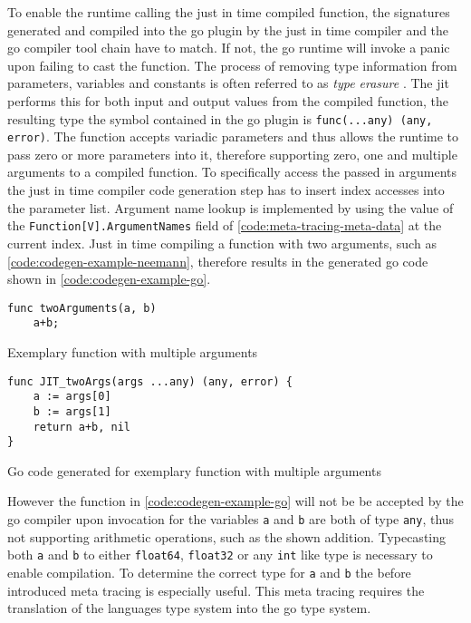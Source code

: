 To enable the runtime calling the just in time compiled function, the
signatures generated and compiled into the go plugin by the just in time
compiler and the go compiler tool chain have to match. If not, the go runtime
will invoke a panic upon failing to cast the function. The process of removing
type information from parameters, variables and constants is often referred to
as \textit{type erasure} \cite[A.2 Type erasure]{crary2002intensional}. The jit
performs this for both input and output values from the compiled function, the
resulting type the symbol contained in the go plugin is
\texttt{func(...any) (any, error)}. The function accepts variadic
parameters and thus allows the runtime to pass zero or more parameters into it,
therefore supporting zero, one and multiple arguments to a compiled function.
To specifically access the passed in arguments the just in time compiler code
generation step has to insert index accesses into the parameter list. Argument
name lookup is implemented by using the value of the
\texttt{Function[V].ArgumentNames} field of
\autoref{code:meta-tracing-meta-data} at the current index. Just in time
compiling a function with two arguments, such as
\autoref{code:codegen-example-neemann}, therefore results in the generated go
code shown in \autoref{code:codegen-example-go}.

\begin{listing}[H]
    \begin{verbatim}
func twoArguments(a, b)
    a+b;
    \end{verbatim}
    \caption{Exemplary function with multiple arguments}
    \label{code:codegen-example-neemann}
\end{listing}

\begin{listing}[H]
    \begin{verbatim}
func JIT_twoArgs(args ...any) (any, error) { 
    a := args[0]
    b := args[1]
    return a+b, nil
}
    \end{verbatim}
    \caption{Go code generated for exemplary function with multiple arguments}
    \label{code:codegen-example-go}
\end{listing}

However the function in \autoref{code:codegen-example-go} will not be be
accepted by the go compiler upon invocation for the variables \texttt{a} and
\texttt{b} are both of type \texttt{any}, thus not supporting
arithmetic operations, such as the shown addition. Typecasting both \texttt{a}
and \texttt{b} to either \texttt{float64}, \texttt{float32} or
any \texttt{int} like type is necessary to enable compilation. To
determine the correct type for \texttt{a} and \texttt{b} the before introduced
meta tracing is especially useful. This meta tracing requires the translation
of the languages type system into the go type system.

